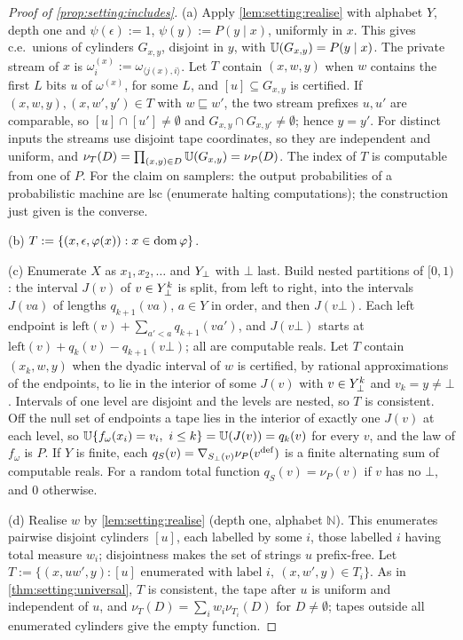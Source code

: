 \begin{proof}[Proof of \cref{prop:setting:includes}]
(a) Apply \cref{lem:setting:realise} with alphabet $Y$, depth one and $\psi(\epsilon):=1$, $\psi(y):=P(y\mid x)$, uniformly in $x$. This gives c.e.\ unions of cylinders $G_{x,y}$, disjoint in $y$, with $\mathbb{U}(G_{x,y})=P(y\mid x)$. The private stream of $x$ is $\omega^{(x)}_i:=\omega_{\langle j(x),i\rangle}$. Let $T$ contain $(x,w,y)$ when $w$ contains the first $L$ bits $u$ of $\omega^{(x)}$, for some $L$, and $[u]\subseteq G_{x,y}$ is certified. If $(x,w,y),(x,w',y')\in T$ with $w\sqsubseteq w'$, the two stream prefixes $u,u'$ are comparable, so $[u]\cap[u']\ne\emptyset$ and $G_{x,y}\cap G_{x,y'}\ne\emptyset$; hence $y=y'$. For distinct inputs the streams use disjoint tape coordinates, so they are independent and uniform, and $\nu_T(D)=\prod_{(x,y)\in D}\mathbb{U}(G_{x,y})=\nu_P(D)$. The index of $T$ is computable from one of $P$. For the claim on samplers: the output probabilities of a probabilistic machine are lsc (enumerate halting computations); the construction just given is the converse.

(b) $T:=\{(x,\epsilon,\varphi(x)):x\in\operatorname{dom}\varphi\}$.

(c) Enumerate $X$ as $x_1,x_2,\dots$ and $Y_{\bot}$ with $\bot$ last. Build nested partitions of $[0,1)$: the interval $J(v)$ of $v\in Y_{\bot}^k$ is split, from left to right, into the intervals $J(va)$ of lengths $q_{k+1}(va)$, $a\in Y$ in order, and then $J(v\bot)$. Each left endpoint is $\mathrm{left}(v)+\sum_{a'<a}q_{k+1}(va')$, and $J(v\bot)$ starts at $\mathrm{left}(v)+q_k(v)-q_{k+1}(v\bot)$; all are computable reals. Let $T$ contain $(x_k,w,y)$ when the dyadic interval of $w$ is certified, by rational approximations of the endpoints, to lie in the interior of some $J(v)$ with $v\in Y_{\bot}^k$ and $v_k=y\ne\bot$. Intervals of one level are disjoint and the levels are nested, so $T$ is consistent. Off the null set of endpoints a tape lies in the interior of exactly one $J(v)$ at each level, so $\Unif\{f_\omega(x_i)=v_i,\ i\le k\}=\Unif(J(v))=q_k(v)$ for every $v$, and the law of $f_\omega$ is $P$. If $Y$ is finite, each $q_S(v)=\nabla_{S_\bot(v)}\nu_P(v^{\rm def})$ is a finite alternating sum of computable reals. For a random total function $q_S(v)=\nu_P(v)$ if $v$ has no $\bot$, and $0$ otherwise.

(d) Realise $w$ by \cref{lem:setting:realise} (depth one, alphabet $\mathbb N$). This enumerates pairwise disjoint cylinders $[u]$, each labelled by some $i$, those labelled $i$ having total measure $w_i$; disjointness makes the set of strings $u$ prefix-free. Let $T:=\{(x,uw',y):[u]\text{ enumerated with label }i,\ (x,w',y)\in T_i\}$. As in \cref{thm:setting:universal}, $T$ is consistent, the tape after $u$ is uniform and independent of $u$, and $\nu_T(D)=\sum_iw_i\nu_{T_i}(D)$ for $D\ne\emptyset$; tapes outside all enumerated cylinders give the empty function.
\end{proof}

